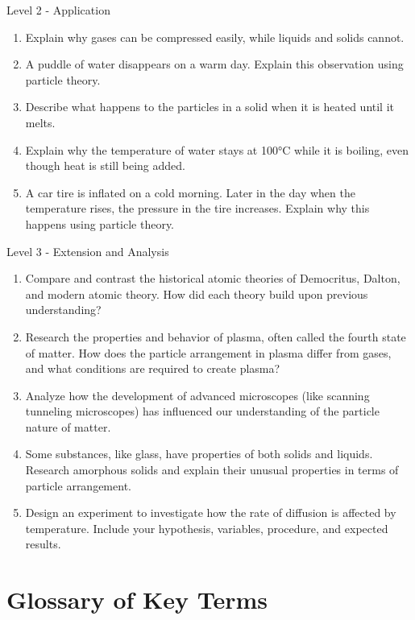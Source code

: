 \begin{tieredquestions}{Level 2 - Application}
\begin{enumerate}
    \item Explain why gases can be compressed easily, while liquids and solids cannot.
    \item A puddle of water disappears on a warm day. Explain this observation using particle theory.
    \item Describe what happens to the particles in a solid when it is heated until it melts.
    \item Explain why the temperature of water stays at 100°C while it is boiling, even though heat is still being added.
    \item A car tire is inflated on a cold morning. Later in the day when the temperature rises, the pressure in the tire increases. Explain why this happens using particle theory.
\end{enumerate}
\end{tieredquestions}

\begin{tieredquestions}{Level 3 - Extension and Analysis}
\begin{enumerate}
    \item Compare and contrast the historical atomic theories of Democritus, Dalton, and modern atomic theory. How did each theory build upon previous understanding?
    \item Research the properties and behavior of plasma, often called the fourth state of matter. How does the particle arrangement in plasma differ from gases, and what conditions are required to create plasma?
    \item Analyze how the development of advanced microscopes (like scanning tunneling microscopes) has influenced our understanding of the particle nature of matter.
    \item Some substances, like glass, have properties of both solids and liquids. Research amorphous solids and explain their unusual properties in terms of particle arrangement.
    \item Design an experiment to investigate how the rate of diffusion is affected by temperature. Include your hypothesis, variables, procedure, and expected results.
\end{enumerate}
\end{tieredquestions}

\section{Glossary of Key Terms}


